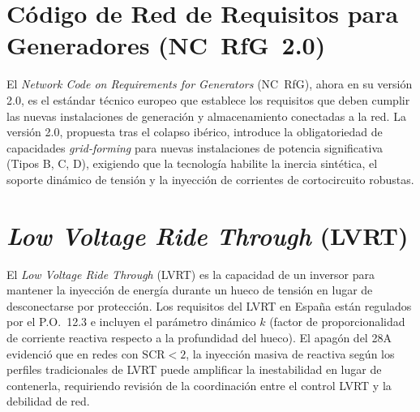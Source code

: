 \section{Código de Red de Requisitos para Generadores (NC~RfG~2.0)}
\label{anexo:nc_rfg}
El \textit{Network Code on Requirements for Generators} (NC~RfG), ahora
en su versión 2.0, es el estándar técnico europeo que establece los
requisitos que deben cumplir las nuevas instalaciones de generación y
almacenamiento conectadas a la red. La versión 2.0, propuesta tras el
colapso ibérico, introduce la obligatoriedad de capacidades
\textit{grid-forming} para nuevas instalaciones de potencia significativa
(Tipos B, C, D), exigiendo que la tecnología habilite la inercia
sintética, el soporte dinámico de tensión y la inyección de corrientes
de cortocircuito robustas.

\section{\textit{Low Voltage Ride Through} (LVRT)}
\label{anexo:lvrt}
El \textit{Low Voltage Ride Through} (LVRT) es la capacidad de un
inversor para mantener la inyección de energía durante un hueco de
tensión en lugar de desconectarse por protección. Los requisitos del
LVRT en España están regulados por el P.O.~12.3 e incluyen el parámetro
dinámico $k$ (factor de proporcionalidad de corriente reactiva respecto
a la profundidad del hueco). El apagón del 28A evidenció que en redes
con $\mathrm{SCR} < 2$, la inyección masiva de reactiva según los
perfiles tradicionales de LVRT puede amplificar la inestabilidad en lugar
de contenerla, requiriendo revisión de la coordinación entre el control
LVRT y la debilidad de red.

